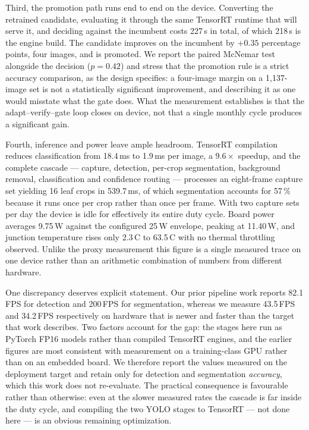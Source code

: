 \documentclass[journal]{IEEEtran}
\begin{document}
Third, the promotion path runs end to end on the device. Converting the retrained
candidate, evaluating it through the same TensorRT runtime that will serve it, and
deciding against the incumbent costs 227\,s in total, of which 218\,s is the engine
build. The candidate improves on the incumbent by $+0.35$ percentage points, four
images, and is promoted. We report the paired McNemar test alongside the decision
($p=0.42$) and stress that the promotion rule is a strict accuracy comparison, as
the design specifies: a four-image margin on a 1{,}137-image set is not a
statistically significant improvement, and describing it as one would misstate what
the gate does. What the measurement establishes is that the adapt--verify--gate
loop closes on device, not that a single monthly cycle produces a significant gain.

Fourth, inference and power leave ample headroom. TensorRT compilation reduces
classification from 18.4\,ms to 1.9\,ms per image, a $9.6\times$ speedup, and the
complete cascade --- capture, detection, per-crop segmentation, background removal,
classification and confidence routing --- processes an eight-frame capture set
yielding 16 leaf crops in 539.7\,ms, of which segmentation accounts for 57\,\%
because it runs once per crop rather than once per frame. With two capture sets per
day the device is idle for effectively its entire duty cycle. Board power averages
9.75\,W against the configured 25\,W envelope, peaking at 11.40\,W, and junction
temperature rises only 2.3\,\textdegree C to 63.5\,\textdegree C with no thermal
throttling observed. Unlike the proxy measurement this figure is a single measured
trace on one device rather than an arithmetic combination of numbers from different
hardware.

One discrepancy deserves explicit statement. Our prior pipeline work \cite{ref21}
reports 82.1\,FPS for detection and 200\,FPS for segmentation, whereas we measure
43.5\,FPS and 34.2\,FPS respectively on hardware that is newer and faster than the
target that work describes. Two factors account for the gap: the stages here run as
PyTorch FP16 models rather than compiled TensorRT engines, and the earlier figures
are most consistent with measurement on a training-class GPU rather than on an
embedded board. We therefore report the values measured on the deployment target
and retain \cite{ref21} only for detection and segmentation \emph{accuracy}, which
this work does not re-evaluate. The practical consequence is favourable rather than
otherwise: even at the slower measured rates the cascade is far inside the duty
cycle, and compiling the two YOLO stages to TensorRT --- not done here --- is an
obvious remaining optimization.
\end{document}
